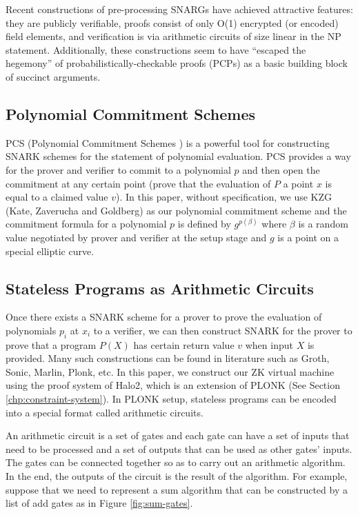 Recent constructions of pre-processing SNARGs have achieved attractive features: they are publicly verifiable, proofs consist of only O(1) encrypted (or encoded) field elements, and verification is via arithmetic circuits of size linear in the NP statement. Additionally, these constructions seem to have “escaped the hegemony” of probabilistically-checkable proofs (PCPs) as a basic building block of succinct arguments.


\subsection{Polynomial Commitment Schemes}
PCS (Polynomial Commitment Schemes \cite{boneh2020halo-pcs,boneh2020efficient-pcs,kate2010polynomial-pcs}) is a powerful tool for constructing SNARK schemes for the statement of polynomial evaluation. PCS provides a way for the prover and verifier to commit to a polynomial $p$ and then open the commitment at any certain point (prove that the evaluation of $P$ a point $x$ is equal to a claimed value $v$). In this paper, without specification, we use KZG (Kate, Zaverucha and Goldberg) as our polynomial commitment scheme and the commitment formula for a polynomial $p$ is defined by $g^{p(\beta)}$ where $\beta$ is a random value negotiated by prover and verifier at the setup stage and $g$ is a point on a special elliptic curve.

\subsection{Stateless Programs as Arithmetic Circuits}
\label{chp:arith-circuits}
Once there exists a SNARK scheme for a prover to prove the evaluation of polynomials $p_i$ at $x_i$ to a verifier, we can then construct SNARK for the prover to prove that a program $P(X)$ has certain return value $v$ when input $X$ is provided. Many such constructions can be found in literature such as Groth, Sonic, Marlin, Plonk, etc. In this paper, we construct our ZK virtual machine using the proof system of Halo2, which is an extension of PLONK (See Section \ref{chp:constraint-system}). In PLONK setup, stateless programs can be encoded into a special format called arithmetic circuits.

An arithmetic circuit is a set of gates and each gate can have a set of inputs that need to be processed and a set of outputs that can be used as other gates' inputs. The gates can be connected together so as to carry out an arithmetic algorithm. In the end, the outputs of the circuit is the result of the algorithm. For example, suppose that we need to represent a sum algorithm that can be constructed by a list of add gates as in Figure \ref{fig:sum-gates}.

